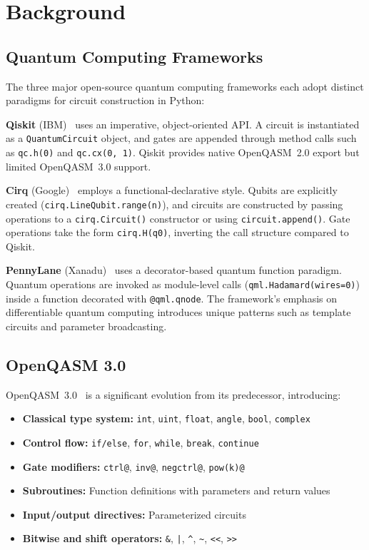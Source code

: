 \documentclass[conference]{IEEEtran}
\begin{document}
\section{Background}
\label{sec:background}

\subsection{Quantum Computing Frameworks}

The three major open-source quantum computing frameworks each adopt distinct paradigms for circuit construction in Python:

\textbf{Qiskit} (IBM)~\cite{qiskit2024} uses an imperative, object-oriented API. A circuit is instantiated as a \texttt{QuantumCircuit} object, and gates are appended through method calls such as \texttt{qc.h(0)} and \texttt{qc.cx(0, 1)}. Qiskit provides native OpenQASM~2.0 export but limited OpenQASM~3.0 support.

\textbf{Cirq} (Google)~\cite{cirq2024} employs a functional-declarative style. Qubits are explicitly created (\texttt{cirq.LineQubit.range(n)}), and circuits are constructed by passing operations to a \texttt{cirq.Circuit()} constructor or using \texttt{circuit.append()}. Gate operations take the form \texttt{cirq.H(q0)}, inverting the call structure compared to Qiskit.

\textbf{PennyLane} (Xanadu)~\cite{pennylane2024} uses a decorator-based quantum function paradigm. Quantum operations are invoked as module-level calls (\texttt{qml.Hadamard(wires=0)}) inside a function decorated with \texttt{@qml.qnode}. The framework's emphasis on differentiable quantum computing introduces unique patterns such as template circuits and parameter broadcasting.

\subsection{OpenQASM 3.0}

OpenQASM~3.0~\cite{cross2022openqasm} is a significant evolution from its predecessor, introducing:
\begin{itemize}
    \item \textbf{Classical type system:} \texttt{int}, \texttt{uint}, \texttt{float}, \texttt{angle}, \texttt{bool}, \texttt{complex}
    \item \textbf{Control flow:} \texttt{if/else}, \texttt{for}, \texttt{while}, \texttt{break}, \texttt{continue}
    \item \textbf{Gate modifiers:} \texttt{ctrl@}, \texttt{inv@}, \texttt{negctrl@}, \texttt{pow(k)@}
    \item \textbf{Subroutines:} Function definitions with parameters and return values
    \item \textbf{Input/output directives:} Parameterized circuits
    \item \textbf{Bitwise and shift operators:} \texttt{\&}, \texttt{|}, \texttt{\^}, \texttt{\~}, \texttt{<<}, \texttt{>>}
\end{itemize}
\end{document}
